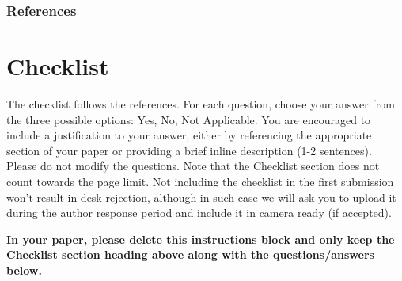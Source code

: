 \documentclass[twoside]{article}
\begin{document}
\newpage
\subsubsection*{References}






\newpage

\section*{Checklist}


The checklist follows the references. For each question, choose your answer from the three possible options: Yes, No, Not Applicable.  You are encouraged to include a justification to your answer, either by referencing the appropriate section of your paper or providing a brief inline description (1-2 sentences). 
Please do not modify the questions.  Note that the Checklist section does not count towards the page limit. Not including the checklist in the first submission won't result in desk rejection, although in such case we will ask you to upload it during the author response period and include it in camera ready (if accepted).

\textbf{In your paper, please delete this instructions block and only keep the Checklist section heading above along with the questions/answers below.}
\end{document}
